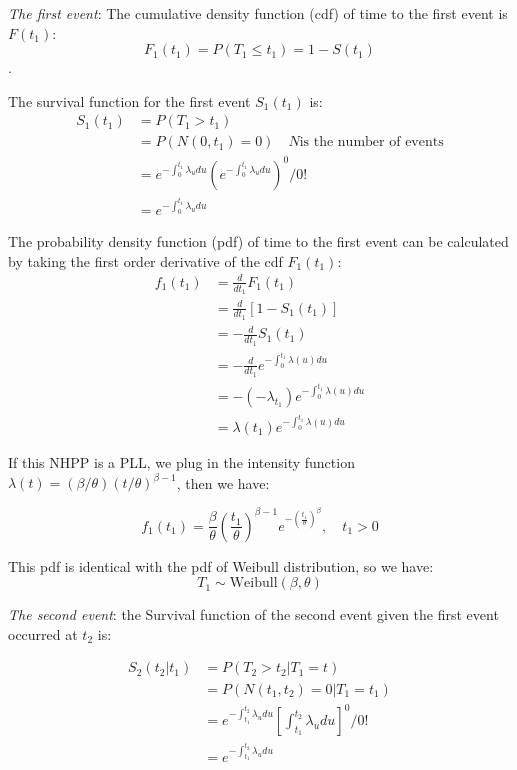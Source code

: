 \documentclass[12pt]{book}
\numberwithin{equation}{chapter}
\begin{document}
\emph{The first event}: The cumulative density function (cdf) of time to the first event is \(F(t_1)\): \[F_1(t_1) = P(T_1 \leq t_1) = 1 - S(t_1)\].

The survival function for the first event \(S_1(t_1)\) is:
\begin{align*}
S_1(t_1) & = P(T_1 > t_1) \\
 & = P(N(0, t_1) = 0) \quad N \text{is the number of events}\\
 & = e^{-\int_{0}^{t_1}\lambda_{u}du}(e^{-\int_{0}^{t_1}\lambda_{u}du})^0/0!\\
 & = e^{-\int_{0}^{t_1}\lambda_{u}du}
\end{align*}

The probability density function (pdf) of time to the first event can be calculated by taking the first order derivative of the cdf \(F_1(t_1)\):
\begin{align*}
f_1(t_1) & = \frac{d}{dt_1}F_1(t_1)\\
& = \frac{d}{dt_1}[1 - S_1(t_1)] \\
& = - \frac{d}{dt_1}S_1(t_1)\\
& = - \frac{d}{dt_1}e^{-\int_{0}^{t_1}\lambda (u)du}\\
& = -(-\lambda_{t_1})e^{-\int_{0}^{t_1}\lambda (u)du}\\
& = \lambda (t_1)e^{-\int_{0}^{t_1}\lambda (u)du}
\end{align*}

If this NHPP is a PLL, we plug in the intensity function \(\lambda(t) = (\beta / \theta)(t/\theta)^{\beta - 1}\), then we have:

\[f_1(t_1) = \frac{\beta}{\theta}(\frac{t_1}{\theta})^{\beta - 1}e^{-(\frac{t_1}{\theta})^\beta}, \quad t_1 > 0\]

This pdf is identical with the pdf of Weibull distribution, so we have:
\[T_1 \sim \text{Weibull}(\beta, \theta)\]

\emph{The second event}: the Survival function of the second event given the first event occurred at \(t_2\) is:

\begin{align*}
S_2(t_2 | t_1) & = P(T_2 > t_2 | T_1 = t)\\
& = P(N(t_1, t_2) = 0|T_1 = t_1) \\
& = e^{-\int_{t_1}^{t_2}\lambda_{u}du}[\int_{t_1}^{t_2}\lambda_{u}du]^0/0!\\
& = e^{-\int_{t_1}^{t_2}\lambda_{u}du}
\end{align*}
\end{document}

